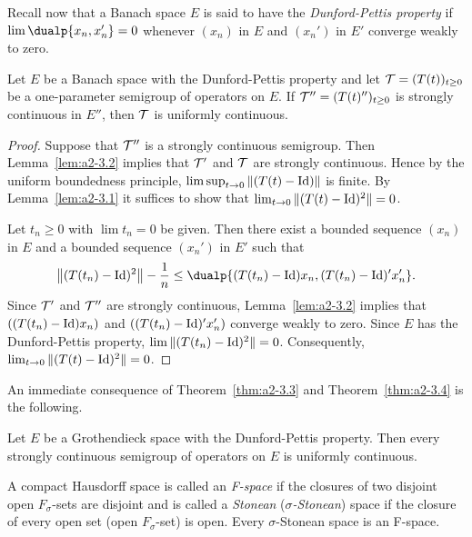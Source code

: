 Recall now that a Banach space $E$ is said to have the \emph{Dunford-Pettis property} if\/ $\lim \dualp{x_{n},x_{n}'} = 0$ whenever $(x_{n})$ in $E$ and $(x_{n}')$ in $E'$ converge weakly to zero.
\begin{theorem}\label{thm:a2-3.4}
Let $E$ be a Banach space with the Dunford-Pettis property and let  $\TT = (T(t))_{t \geq 0}$ be a one-parameter semigroup of operators on $E$.
If  $\TT'' = (T(t)'')_{t \geq 0}$ is strongly continuous in $E''$, then $\mathcal{T}$ is uniformly continuous.
\end{theorem}
\begin{proof}
Suppose that $\mathcal{T}''$ is a strongly continuous semigroup.
Then Lemma~\ref{lem:a2-3.2}   implies that $\mathcal{T}'$ and $\mathcal{T}$ are strongly continuous.
Hence by the uniform boundedness principle, $\limsup_{t \to 0} \|(T(t) - \operatorname{Id})\|$ is finite.
By Lemma~\ref{lem:a2-3.1}   it suffices to show that $\lim_{t \to 0} \|(T(t) - \operatorname{Id})^2\| = 0$.

Let $t_{n} \geq 0$ with $\lim t_{n} = 0$ be given.
Then there exist a bounded sequence $(x_{n})$ in $E$ and a bounded sequence $(x_{n}')$ in $E'$ such that
\[
\left\|(T(t_{n}) - \Id)^2 \right\| - \frac{1}{n} \leq \dualp{(T(t_{n}) - \Id)x_{n}, (T(t_{n}) - \Id)'x_{n}'} .
\]
Since $\mathcal{T}'$ and $\mathcal{T}''$ are strongly continuous, Lemma~\ref{lem:a2-3.2}   implies that $((T(t_{n}) - \operatorname{Id})x_{n})$ and $((T(t_{n}) - \operatorname{Id})'x_{n}')$ converge weakly to zero.
Since $E$ has the Dunford-Pettis property, $\lim \|(T(t_{n}) - \operatorname{Id})^2\| = 0$.
Consequently, $\lim_{t \to 0} \|(T(t) - \operatorname{Id})^2\| = 0$.
\end{proof}
An immediate consequence of Theorem~\ref{thm:a2-3.3}   and Theorem~\ref{thm:a2-3.4}   is the following.
\begin{theorem}\label{thm:a2-3.5}
Let $E$ be a Grothendieck space with the Dunford-Pettis property.
Then every strongly continuous semigroup of operators on $E$ is uniformly continuous.
\end{theorem}
A compact Hausdorff space is called an \emph{F-space} if the closures of two disjoint open $F_{\sigma}$-sets are disjoint and is called a \emph{Stonean} (\resp \emph{$\sigma$-Stonean}) space if the closure of every open set (\resp open $F_{\sigma}$-set) is open.
Every $\sigma$-Stonean space is an F-space.
